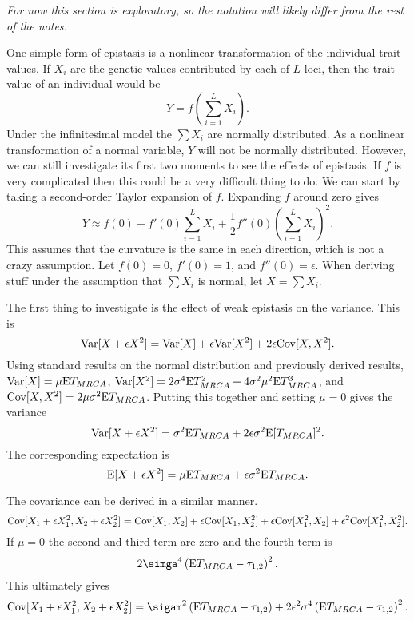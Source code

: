 \textit{For now this section is exploratory, so the notation will likely differ
  from the rest of the notes.}

One simple form of epistasis is a nonlinear transformation of the individual
trait values. If $X_i$ are the genetic values contributed by each of $L$ loci,
then the trait value of an individual would be
\begin{equation*}
  Y = f\left(\sum_{i=1}^{L} X_i\right).
\end{equation*}
Under the infinitesimal model the $\sum X_i$ are normally distributed. As a
nonlinear transformation of a normal variable, $Y$ will not be normally
distributed. However, we can still investigate its first two moments to see the
effects of epistasis. If $f$ is very complicated then this could be a very
difficult thing to do. We can start by taking a second-order Taylor expansion of
$f$. Expanding $f$ around zero gives
\begin{equation*}
  Y \approx f(0) + f'(0)\sum_{i=1}^L X_i + \frac{1}{2}f''(0)\left(\sum_{i=1}^L X_i\right)^2.
\end{equation*}
This assumes that the curvature is the same in each direction, which is not a
crazy assumption. Let $f(0)=0$, $f'(0)=1$, and $f''(0)=\epsilon$. When deriving
stuff under the assumption that $\sum X_i$ is normal, let $X=\sum X_i$.

The first thing to investigate is the effect of weak epistasis on the variance.
This is
\begin{equation*}
  \mathrm{Var}[X + \epsilon X^2] = \mathrm{Var}[X] + \epsilon \mathrm{Var}[X^2] + 2 \epsilon \mathrm{Cov}[X,X^2].  
\end{equation*}
Using standard results on the normal distribution and previously derived
results, $\mathrm{Var}[X]=\mu \mathrm{E} T_{MRCA}$, $\mathrm{Var}[X^2]=2\sigma^4\mathrm{E} T_{MRCA}^2+4\sigma^2\mu^2 \mathrm{E} T_{MRCA}^3$,
and $\mathrm{Cov}[X,X^2]=2\mu\sigma^2 \mathrm{E} T_{MRCA}$. Putting this together and setting $\mu=0$ gives the
variance
\begin{equation}
  \mathrm{Var}[X + \epsilon X^2] = \sigma^2\mathrm{E} T_{MRCA} + 2\epsilon \sigma^2 \mathrm{E} [T_{MRCA}]^2.
\end{equation}
The corresponding expectation is
\begin{equation}
  \mathrm{E}[X + \epsilon X^2] = \mu \mathrm{E} T_{MRCA} + \epsilon \sigma^2 \mathrm{E} T_{MRCA}.
\end{equation}

The covariance can be derived in a similar manner.
\begin{equation}
  \mathrm{Cov}[X_1 + \epsilon X_1^2,X_2 + \epsilon X_2^2] = \mathrm{Cov}[X_1,X_2] + \epsilon
  \mathrm{Cov}[X_1,X_2^2] + \epsilon \mathrm{Cov}[X_1^2,X_2] + \epsilon^2 \mathrm{Cov}[X_1^2,X_2^2].
\end{equation}
If $\mu=0$ the second and third term are zero and the fourth term is
\begin{equation*}
  2\simga^4\left( \E T_{MRCA} - \tau_{1,2} \right)^2.
\end{equation*}
This ultimately gives
\begin{equation}
  \Cov[X_1 + \epsilon X_1^2,X_2 + \epsilon X_2^2] = \sigam^2\left(\E T_{MRCA} -
  \tau_{1,2}\right) + 2\epsilon^2 \sigma^4\left(\E T_{MRCA} -
  \tau_{1,2}\right)^2.
\end{equation}


